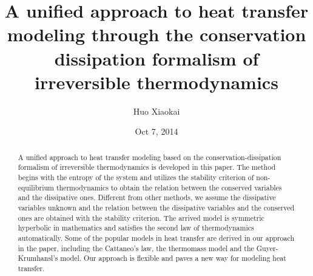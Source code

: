 \documentclass[a4paper]{article}
\title{A unified approach to heat transfer modeling through the conservation dissipation formalism of irreversible thermodynamics}
\author{Huo Xiaokai}
\date{Oct 7, 2014}
\begin{document}
\maketitle

\begin{abstract} 
A unified approach to heat transfer modeling based on the conservation-dissipation formalism of irreversible thermodynamics is developed in this paper. The method begins with the entropy of the system and utilizes the stability criterion of non-equilibrium thermodynamics to obtain the relation between the conserved variables and the dissipative ones. Different from other methods, we assume the dissipative variables unknown and the relation between the dissipative variables and the conserved ones are obtained with the stability criterion. The arrived model is symmetric hyperbolic in mathematics and satisfies the second law of thermodynamics automatically. Some of the popular models in heat transfer are derived in our approach in the paper, including the Cattaneo's law, the thermomass model and the Guyer-Krumhansl's model. Our approach is flexible and paves a new way for modeling heat transfer. 
\end{abstract}
\end{document}
